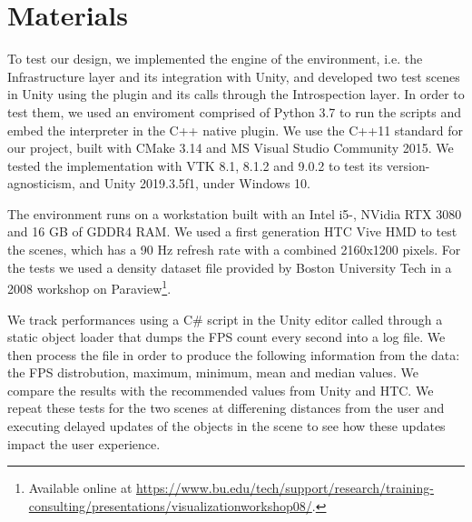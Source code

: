 \chapter{Materials}
\label{ch:materials}

To test our design, we implemented the engine of the environment, i.e. the Infrastructure layer and its integration with Unity, and developed two test scenes in Unity using the plugin and its calls through the Introspection layer. In order to test them, we used an enviroment comprised of Python 3.7 to run the scripts and embed the interpreter in the C++ native plugin. We use the C++11 standard for our project, built with CMake 3.14 and MS Visual Studio Community 2015. We tested the implementation with VTK 8.1, 8.1.2 and 9.0.2 to test its version-agnosticism, and Unity 2019.3.5f1, under Windows 10.

The environment runs on a workstation built with an Intel i5-, NVidia RTX 3080 and 16 GB of GDDR4 RAM. We used a first generation HTC Vive HMD to test the scenes, which has a 90 Hz refresh rate with a combined 2160x1200 pixels. For the tests we used a density dataset file provided by Boston University Tech in a 2008 workshop on Paraview\footnote{Available online at \url{https://www.bu.edu/tech/support/research/training-consulting/presentations/visualizationworkshop08/}.}. 

We track performances using a C\# script in the Unity editor called through a static object loader that dumps the FPS count every second into a log file. We then process the file in order to produce the following information from the data: the FPS distrobution, maximum, minimum, mean and median values. We compare the results with the recommended values from Unity and HTC. We repeat these tests for the two scenes at differening distances from the user and executing delayed updates of the objects in the scene to see how these updates impact the user experience.